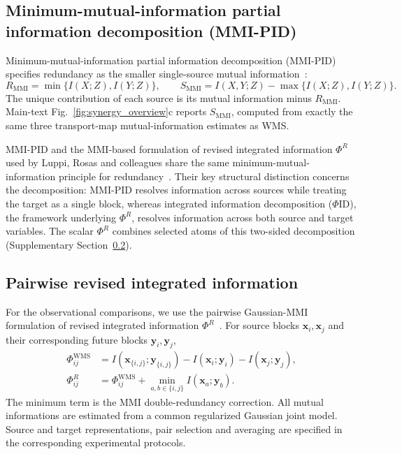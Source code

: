 \documentclass[fleqn,10pt]{wlscirep}
\begin{document}
\subsection{Minimum-mutual-information partial information decomposition (MMI-PID)}
\label{app:mmi_pid}
Minimum-mutual-information partial information decomposition (MMI-PID) specifies redundancy as the smaller single-source mutual information~\cite{barrett2015exploration}:
\begingroup
\begin{equation}
R_{\mathrm{MMI}}=\min\{I(X;Z),I(Y;Z)\},\qquad
S_{\mathrm{MMI}}=I(X,Y;Z)-\max\{I(X;Z),I(Y;Z)\}.
\end{equation}
\endgroup
The unique contribution of each source is its mutual information minus $R_{\mathrm{MMI}}$. Main-text Fig.~\ref{fig:synergy_overview}c reports $S_{\mathrm{MMI}}$, computed from exactly the same three transport-map mutual-information estimates as WMS.

MMI-PID and the MMI-based formulation of revised integrated information $\Phi^{R}$ used by Luppi, Rosas and colleagues share the same minimum-mutual-information principle for redundancy~\cite{barrett2015exploration,luppi2024synergistic,Mediano2025TowardAU}. Their key structural distinction concerns the decomposition: MMI-PID resolves information across sources while treating the target as a single block, whereas integrated information decomposition ($\Phi$ID), the framework underlying $\Phi^{R}$, resolves information across both source and target variables. The scalar $\Phi^{R}$ combines selected atoms of this two-sided decomposition (Supplementary Section~\ref{app:phi_r}).
 

\subsection{Pairwise revised integrated information}
\label{app:phi_r}

For the observational comparisons, we use the pairwise Gaussian-MMI formulation of revised integrated information $\Phi^R$~\cite{Mediano2025TowardAU}. For source blocks $\boldsymbol{x}_i,\boldsymbol{x}_j$ and their corresponding future blocks $\boldsymbol{y}_i,\boldsymbol{y}_j$,
\begin{align}
\Phi^{\mathrm{WMS}}_{ij}
&=I(\boldsymbol{x}_{\{i,j\}};\boldsymbol{y}_{\{i,j\}})
-I(\boldsymbol{x}_i;\boldsymbol{y}_i)-I(\boldsymbol{x}_j;\boldsymbol{y}_j),
\label{eq:app_pair_phi_wms}\\
\Phi^R_{ij}
&=\Phi^{\mathrm{WMS}}_{ij}
+\min_{a,b\in\{i,j\}}I(\boldsymbol{x}_a;\boldsymbol{y}_b).
\label{eq:app_pair_phi_r}
\end{align}
The minimum term is the MMI double-redundancy correction. All mutual informations are estimated from a common regularized Gaussian joint model. Source and target representations, pair selection and averaging are specified in the corresponding experimental protocols.
\end{document}
